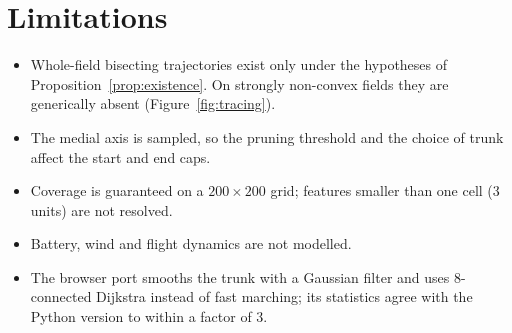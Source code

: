 \documentclass[11pt,a4paper]{article}
\numberwithin{equation}{section}
\theoremstyle{plain}
\theoremstyle{definition}
\theoremstyle{remark}
\begin{document}
\section{Limitations}

\begin{itemize}
  \item Whole-field bisecting trajectories exist only under the hypotheses of Proposition~\ref{prop:existence}. On strongly non-convex fields they are generically absent (Figure~\ref{fig:tracing}).
  \item The medial axis is sampled, so the pruning threshold and the choice of trunk affect the start and end caps.
  \item Coverage is guaranteed on a $200\times200$ grid; features smaller than one cell (3 units) are not resolved.
  \item Battery, wind and flight dynamics are not modelled.
  \item The browser port smooths the trunk with a Gaussian filter and uses 8-connected Dijkstra instead of fast marching; its statistics agree with the Python version to within a factor of 3.
\end{itemize}
\end{document}
